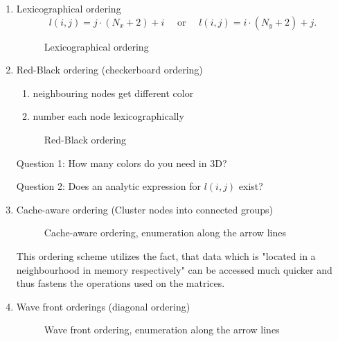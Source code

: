 \begin{enumerate}[label=\alph{enumi})]
	\item  Lexicographical ordering
		\[
			l(i,j) = j \cdot (N_{x} + 2) + i 
			\quad\text{ or }\quad
			l(i,j) = i \cdot (N_{y} + 2) + j
		.\] 

		\begin{figure}[ht!]
			\begin{center}
				
			\end{center}
			\caption{Lexicographical ordering}
			\label{fig:lexiorder}
		\end{figure}
		
	\item Red-Black ordering (checkerboard ordering)

		\begin{enumerate}[label=\arabic{enumii})]
			\item neighbouring nodes get different color
			\item number each node lexicographically
		\end{enumerate}

		\begin{figure}[ht!]
			\begin{center}
				
			\end{center}
			\caption{Red-Black ordering}
			\label{fig:redblackorder}
		\end{figure}

		Question 1: How many colors do you need in 3D?

		Question 2: Does an analytic expression for $l(i,j)$ exist?
	\item Cache-aware ordering (Cluster nodes into connected groups)

		\begin{figure}[ht!]
			\begin{center}
				
			\end{center}
			\caption{Cache-aware ordering, enumeration along the arrow lines}
			\label{fig:cacheorder}
		\end{figure}
		
		This ordering scheme utilizes the fact, that data which is "located in a neighbourhood in memory respectively" can be accessed much quicker and thus fastens the operations used on the matrices.

	\item Wave front orderings (diagonal ordering)

		\begin{figure}[ht!]
			\begin{center}
				
			\end{center}
			\caption{Wave front ordering, enumeration along the arrow lines}
			\label{fig:waveorder}
		\end{figure}
		
\end{enumerate}

